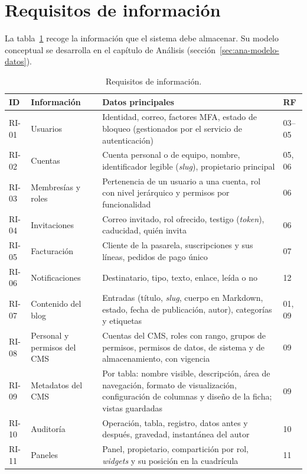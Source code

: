 \section{Requisitos de información}
\label{sec:req-ri}

La tabla~\ref{tab:req-ri} recoge la información que el sistema debe almacenar.
Su modelo conceptual se desarrolla en el capítulo de Análisis
(sección~\ref{sec:ana-modelo-datos}).

\begin{table}[htbp]
  \centering
  \footnotesize
  \caption{Requisitos de información.}
  \label{tab:req-ri}
  \begin{tabularx}{\textwidth}{@{}l>{\raggedright\arraybackslash}p{3.1cm}Xl@{}}
    \toprule
    \textbf{ID} & \textbf{Información} & \textbf{Datos principales} & \textbf{RF} \\
    \midrule
    RI-01 & Usuarios & Identidad, correo, factores MFA, estado de bloqueo (gestionados por el servicio de autenticación) & 03--05 \\
    RI-02 & Cuentas & Cuenta personal o de equipo, nombre, identificador legible (\textit{slug}), propietario principal & 05, 06 \\
    RI-03 & Membresías y roles & Pertenencia de un usuario a una cuenta, rol con nivel jerárquico y permisos por funcionalidad & 06 \\
    RI-04 & Invitaciones & Correo invitado, rol ofrecido, testigo (\textit{token}), caducidad, quién invita & 06 \\
    RI-05 & Facturación & Cliente de la pasarela, suscripciones y sus líneas, pedidos de pago único & 07 \\
    RI-06 & Notificaciones & Destinatario, tipo, texto, enlace, leída o no & 12 \\
    RI-07 & Contenido del blog & Entradas (título, \textit{slug}, cuerpo en Markdown, estado, fecha de publicación, autor), categorías y etiquetas & 01, 09 \\
    RI-08 & Personal y permisos del CMS & Cuentas del CMS, roles con rango, grupos de permisos, permisos de datos, de sistema y de almacenamiento, con vigencia & 09 \\
    RI-09 & Metadatos del CMS & Por tabla: nombre visible, descripción, área de navegación, formato de visualización, configuración de columnas y diseño de la ficha; vistas guardadas & 09 \\
    RI-10 & Auditoría & Operación, tabla, registro, datos antes y después, gravedad, instantánea del autor & 10 \\
    RI-11 & Paneles & Panel, propietario, compartición por rol, \textit{widgets} y su posición en la cuadrícula & 11 \\
    \bottomrule
  \end{tabularx}
\end{table}

